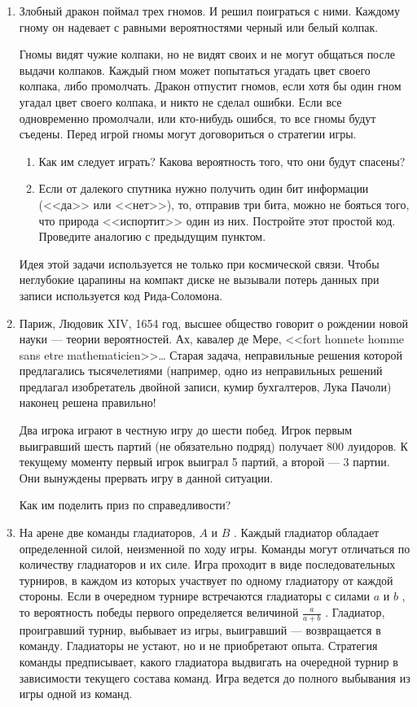 \documentclass{tufte-handout}
\begin{document}
\begin{enumerate}
\item Злобный дракон поймал трех гномов. И решил поиграться с ними. Каждому гному он надевает с равными вероятностями черный или белый колпак. 


Гномы видят чужие колпаки, но не видят своих и не могут общаться после выдачи колпаков. Каждый гном может попытаться угадать цвет своего колпака, либо промолчать. Дракон отпустит гномов, если хотя бы один гном угадал цвет своего колпака, и никто не сделал ошибки. Если все одновременно промолчали, или кто-нибудь ошибся, то все гномы будут съедены. Перед игрой гномы могут договориться о стратегии игры.
\begin{enumerate}
\item Как им следует играть? Какова вероятность того, что они будут спасены?
\item Если от далекого спутника нужно получить один бит информации (<<да>> или <<нет>>), то, отправив три бита, можно не бояться того, что природа <<испортит>> один из них. Постройте этот простой код. Проведите аналогию с предыдущим пунктом. 
\end{enumerate}
Идея этой задачи используется не только при космической связи. Чтобы неглубокие царапины на компакт диске не вызывали потерь данных при записи используется код Рида-Соломона.

\item Париж, Людовик XIV, 1654 год, высшее общество говорит о рождении новой науки --- теории вероятностей. Ах, кавалер де Мере, <<fort honnete homme sans etre mathematicien>>\ldots {} Старая задача, неправильные решения которой предлагались тысячелетиями (например, одно из неправильных решений предлагал изобретатель двойной записи, кумир бухгалтеров, Лука Пачоли) наконец решена правильно!


Два игрока играют в честную игру до шести побед. Игрок первым выигравший шесть партий (не обязательно подряд) получает 800 луидоров. К текущему моменту первый игрок выиграл 5 партий, а второй --- 3 партии. Они вынуждены прервать игру в данной ситуации.


Как им поделить приз по справедливости? 

\item На арене две команды гладиаторов,  $A$  и  $B$ . Каждый гладиатор обладает определенной силой, неизменной по ходу игры. Команды могут отличаться по количеству гладиаторов и их силе. Игра проходит в виде последовательных турниров, в каждом из которых участвует по одному гладиатору от каждой стороны. Если в очередном турнире встречаются гладиаторы с силами  $a$  и  $b$ , то вероятность победы первого определяется величиной  $\frac{a}{a+b} $ . Гладиатор, проигравший турнир, выбывает из игры, выигравший --- возвращается в команду. Гладиаторы не устают, но и не приобретают опыта. Стратегия команды предписывает, какого гладиатора выдвигать на очередной турнир в зависимости текущего состава команд. Игра ведется до полного выбывания из игры одной из команд.


\end{enumerate}
\end{document}
